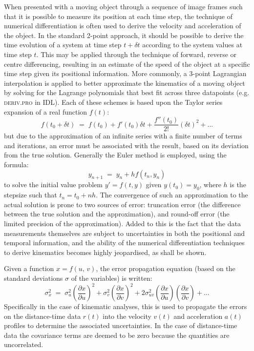 \documentclass[structabstract]{aa}
\begin{document}
When presented with a moving object through a sequence of image frames such that it is possible to measure its position at each time step, the technique of numerical differentiation is often used to derive the velocity and acceleration of the object. In the standard 2-point approach, it should be possible to derive the time evolution of a system at time step $t+\delta t$ according to the system values at time step $t$. This may be applied through the technique of forward, reverse or centre differencing, resulting in an estimate of the speed of the object at a specific time step given its positional information. More commonly, a 3-point Lagrangian interpolation is applied to better approximate the kinematics of a moving object by solving for the Lagrange polynomials that best fit across three datapoints (e.g. \textsc{deriv.pro} in IDL). Each of these schemes is based upon the Taylor series expansion of a real function $f(t)$:
\begin{equation}
\label{taylor1}
f(t_0+\delta t) \; = \; f(t_0)+f'(t_0)\delta t +  \frac{f''(t_0)}{2!}(\delta t)^{2}  + ...
\end{equation}
but due to the approximation of an infinite series with a finite number of terms and iterations, an error must be associated with the result, based on its deviation from the true solution. Generally the Euler method is employed, using the formula:
\begin{equation}
y_{n+1} \; = \; y_n + h f(t_n, y_n)
\end{equation}
to solve the initial value problem $y'=f(t,y)$ given $y(t_0)=y_0$, where $h$ is the stepsize such that $t_n=t_0+nh$. The convergence of such an approximation to the actual solution is prone to two sources of error: truncation error (the difference between the true solution and the approximation), and round-off error (the limited precision of the approximation). Added to this is the fact that the data measurements themselves are subject to uncertainties in both the positional and temporal information, and the ability of the numerical differentiation techniques to derive kinematics becomes highly jeopardised, as shall be shown.

Given a function $x=f(u,\,v)$, the error propagation equation (based on the standard deviations $\sigma$ of the variables) is written:
\begin{equation}
\label{eqn_errorprop}
\sigma_x^2 \; = \; \sigma_u^2 \left(\frac{\partial x}{\partial u}\right) ^2 + \sigma_v^2 \left( \frac{\partial x}{\partial v} \right) ^2 + 2 \sigma_{uv}^2 \left( \frac{\partial x}{\partial u} \right) \left( \frac{\partial x}{\partial v} \right) + ...
\end{equation}
Specifically in the case of kinematic analyses, this is used to propagate the errors on the distance-time data $r(t)$ into the velocity $v(t)$ and acceleration $a(t)$ profiles to determine the associated uncertainties. In the case of distance-time data the covariance terms are deemed to be zero because the quantities are uncorrelated.
\end{document}
